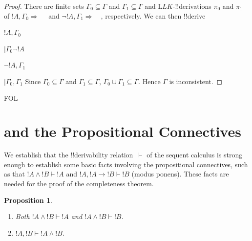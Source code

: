 \documentclass[10pt,a4paper]{article}
\theoremstyle{plain}
\newtheorem{prop}[thm]{Proposition}
\theoremstyle{definition}
\theoremstyle{remark}
\newenvironment{explain}{}{}
\newcommand*{\olfileid}[3]{}
\newcommand*{\olsection}[1]{\section*{#1}}
\newcommand*{\ollabel}[1]{\label{#1}}
\providecommand{\AxiomC}[1]{}
\providecommand{\RightLabel}[1]{}
\providecommand{\fCenter}{}
\newenvironment{prooftree}{}{}
\providecommand{\lif}{\mathbin{\rightarrow}}
\providecommand{\Sequent}{\mathrel{\Rightarrow}}
\providecommand{\Proves}{\mathrel{\vdash}}
\providecommand{\Log}{\ensuremath{\mathrm{L}}}
\providecommand{\iftag}[1]{#1}
\providecommand{\RightR}[1]{}
\providecommand{\Deduce}{\mathrm{D}}
\providecommand{\UnaryInf}{\ensuremath{\mid}}
\providecommand{\BinaryInf}{\ensuremath{\mid}}
\providecommand{\Cut}{\mathrm{Cut}}
\providecommand{\RightR}{\mathrm{R}}
\begin{document}
\begin{proof}
There are finite sets $\Gamma_0 \subseteq \Gamma$ and $\Gamma_1
\subseteq \Gamma$ and $\Log{LK}$-!!{derivation}s $\pi_0$ and $\pi_1$
of $!A, \Gamma_0 \Sequent \quad$ and $\lnot !A, \Gamma_1 \Sequent
\quad$, respectively. We can then !!{derive}
\begin{prooftree}
\AxiomC{}
\RightLabel{$\pi_0$}
\Deduce$ !A, \Gamma_0 \fCenter $
\RightLabel{\RightR{\lnot}}
\UnaryInf$ \Gamma_0 \fCenter \lnot !A$
\AxiomC{}
\RightLabel{$\pi_1$}
\Deduce$\lnot !A, \Gamma_1 \fCenter  $
\RightLabel{\Cut}
\BinaryInf$ \Gamma_0, \Gamma_1 \fCenter $
\end{prooftree}
Since $\Gamma_0 \subseteq \Gamma$ and $\Gamma_1 \subseteq \Gamma$,
$\Gamma_0 \cup \Gamma_1 \subseteq \Gamma$. Hence $\Gamma$ is
inconsistent.
\end{proof}






\iftag{FOL}
      {\olfileid{fol}{seq}{ppr}}
      {\olfileid{pl}{seq}{ppr}}

\olsection{ and the Propositional Connectives}

\begin{explain}
  We establish that the !!{derivability} relation~$\Proves$ of the
  sequent calculus is strong enough to establish some basic facts
  involving the propositional connectives, such as that $!A \land !B
  \Proves !A$ and $!A, !A \lif !B \Proves !B$ (modus ponens). These
  facts are needed for the proof of the completeness theorem.
\end{explain}

\begin{prop}\ollabel{prop:provability-land}
  \begin{enumerate}
  \item \ollabel{prop:provability-land-left} Both $!A \land !B \Proves
    !A$ and $!A \land !B \Proves !B$.
  \item \ollabel{prop:provability-land-right} $!A, !B \Proves !A \land
    !B$.
  \end{enumerate}
\end{prop}
\end{document}
